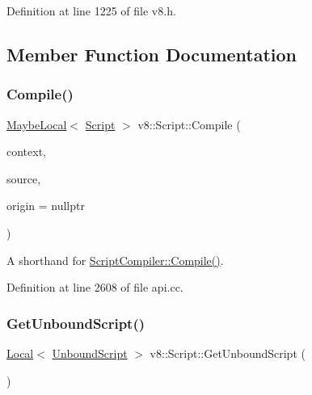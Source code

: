 Definition at line 1225 of file v8.\+h.



\subsection{Member Function Documentation}
\mbox{\label{classv8_1_1Script_acf5759f7f53b2a0eb57e835b32108452}} 
\subsubsection{\texorpdfstring{Compile()}{Compile()}}
{\footnotesize\ttfamily \mbox{\hyperlink{classv8_1_1MaybeLocal}{Maybe\+Local}}$<$ \mbox{\hyperlink{classv8_1_1Script}{Script}} $>$ v8\+::\+Script\+::\+Compile (\begin{DoxyParamCaption}\item[{\mbox{\hyperlink{classv8_1_1Local}{Local}}$<$ Context $>$}]{context,  }\item[{\mbox{\hyperlink{classv8_1_1Local}{Local}}$<$ \mbox{\hyperlink{classv8_1_1String}{String}} $>$}]{source,  }\item[{\mbox{\hyperlink{classv8_1_1ScriptOrigin}{Script\+Origin}} $\ast$}]{origin = {\ttfamily nullptr} }\end{DoxyParamCaption})\hspace{0.3cm}{\ttfamily [static]}}

A shorthand for \mbox{\hyperlink{classv8_1_1ScriptCompiler_a3df9c0af702e46303ded03e84fc5e519}{Script\+Compiler\+::\+Compile()}}. 

Definition at line 2608 of file api.\+cc.

\mbox{\label{classv8_1_1Script_a7f34b85c7687d933284e93e6e2593c14}} 
\subsubsection{\texorpdfstring{Get\+Unbound\+Script()}{GetUnboundScript()}}
{\footnotesize\ttfamily \mbox{\hyperlink{classv8_1_1Local}{Local}}$<$ \mbox{\hyperlink{classv8_1_1UnboundScript}{Unbound\+Script}} $>$ v8\+::\+Script\+::\+Get\+Unbound\+Script (\begin{DoxyParamCaption}{ }\end{DoxyParamCaption})}


